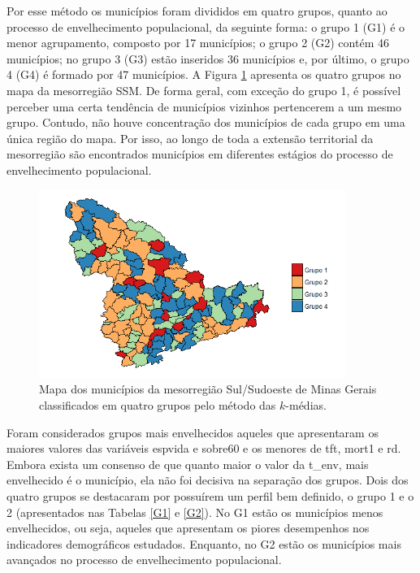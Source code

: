 \documentclass[10pt,twoside]{article}
\begin{document}
Por esse método os municípios foram divididos em quatro grupos, quanto ao processo de envelhecimento populacional, da seguinte forma: o grupo 1 (G1) é o menor agrupamento, composto por 17 municípios; o grupo 2 (G2) contém 46 municípios; no grupo 3 (G3) estão inseridos 36 municípios e, por último, o grupo 4 (G4) é formado por 47 municípios. A Figura \ref{mapa_grupos} apresenta os quatro grupos no mapa da mesorregião SSM. De forma geral, com exceção do grupo 1, é possível perceber uma certa tendência de municípios vizinhos pertencerem a um mesmo grupo. Contudo, não houve concentração dos municípios de cada grupo em uma única região do mapa. Por isso, ao longo de toda a extensão territorial da mesorregião são encontrados municípios em diferentes estágios do processo de envelhecimento populacional.



\begin{figure}[htp!]
\begin{center}
\includegraphics[width=10cm]{mapa}
\end{center}
\caption{Mapa dos municípios da mesorregião Sul/Sudoeste de Minas Gerais classificados em quatro grupos pelo método das $k$-médias.}
\label{mapa_grupos}
\end{figure}
\FloatBarrier

Foram considerados grupos mais envelhecidos aqueles que apresentaram os maiores valores das variáveis espvida e sobre60 e os menores de tft, mort1 e rd. Embora exista um consenso de que quanto maior o valor da t\_env, mais envelhecido é o município, ela não foi decisiva na separação dos grupos. Dois dos quatro grupos se destacaram por possuírem um perfil bem definido, o grupo 1 e o 2 (apresentados nas Tabelas \ref{G1} e \ref{G2}). No G1 estão os municípios menos envelhecidos, ou seja, aqueles que apresentam os piores desempenhos nos indicadores demográficos estudados. Enquanto, no G2 estão os municípios mais avançados no processo de envelhecimento populacional.  
\end{document}
